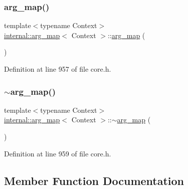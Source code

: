 \subsubsection{\texorpdfstring{arg\+\_\+map()}{arg\_map()}}
{\footnotesize\ttfamily template$<$typename Context$>$ \\
\hyperlink{classinternal_1_1arg__map}{internal\+::arg\+\_\+map}$<$ Context $>$\+::\hyperlink{classinternal_1_1arg__map}{arg\+\_\+map} (\begin{DoxyParamCaption}{ }\end{DoxyParamCaption})\hspace{0.3cm}{\ttfamily [inline]}}



Definition at line 957 of file core.\+h.

\mbox{\label{classinternal_1_1arg__map_a34802ac6b8c15dca0fb55d6663946693}} 
\subsubsection{\texorpdfstring{$\sim$arg\+\_\+map()}{~arg\_map()}}
{\footnotesize\ttfamily template$<$typename Context$>$ \\
\hyperlink{classinternal_1_1arg__map}{internal\+::arg\+\_\+map}$<$ Context $>$\+::$\sim$\hyperlink{classinternal_1_1arg__map}{arg\+\_\+map} (\begin{DoxyParamCaption}{ }\end{DoxyParamCaption})\hspace{0.3cm}{\ttfamily [inline]}}



Definition at line 959 of file core.\+h.



\subsection{Member Function Documentation}
\mbox{\label{classinternal_1_1arg__map_ae7e3b96f6d27cfac78a8df730eee4b8e}} 
